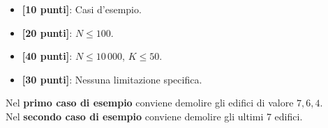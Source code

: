 \begin{itemize}[nolistsep,itemsep=2mm]
  \item \textbf{ [10 punti]}: Casi d'esempio.
  \item \textbf{ [20 punti]}: $N \leq 100$.
  \item \textbf{ [40 punti]}: $N \leq 10\,000$, $K \le 50$.
  \item \textbf{ [30 punti]}: Nessuna limitazione specifica.
\end{itemize}

\Examples
\begin{example}
%
\end{example}
\begin{example}
%
\end{example}


\Explanation
Nel \textbf{primo caso di esempio} conviene demolire gli edifici di valore $7, 6, 4$.\\[2mm]
Nel \textbf{secondo caso di esempio} conviene demolire gli ultimi 7 edifici.
